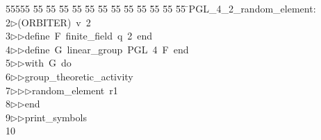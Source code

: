 %
%
\begin{tabbing}
55555 \= 55 \= 55 \= 55 \= 55 \= 55 \= 55 \= 55 \= 55 \= 55 \= 55 \= 55 \= 55 \= \>PGL\_4\_2\_random\_element:\\[0pt]
2\>$\triangleright$\>(ORBITER)\ v\ 2\ \\[0pt]
3\>$\triangleright$\>$\triangleright$\>define\ F\ finite\_field\ q\ 2\ end\ \\[0pt]
4\>$\triangleright$\>$\triangleright$\>define\ G\ linear\_group\ PGL\ 4\ F\ end\ \\[0pt]
5\>$\triangleright$\>$\triangleright$\>with\ G\ do\ \\[0pt]
6\>$\triangleright$\>$\triangleright$\>group\_theoretic\_activity\ \\[0pt]
7\>$\triangleright$\>$\triangleright$\>$\triangleright$\>random\_element\ r1\ \\[0pt]
8\>$\triangleright$\>$\triangleright$\>end\ \\[0pt]
9\>$\triangleright$\>$\triangleright$\>print\_symbols\\[0pt]
10\>\end{tabbing}
